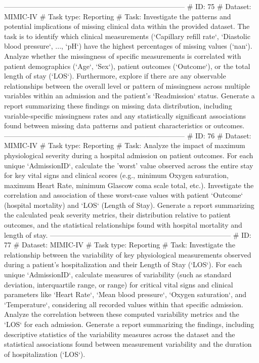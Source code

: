 \begin{tcolorbox}[colback=cadmiumgreen!5!white,colframe=forestgreen!75!white,breakable,title=\textit{Generated analytical tasks in task 4.}]
\begin{VerbatimWrap}
-----------------------------------------------------------------------------
# ID: 75  
# Dataset: MIMIC-IV 
# Task type: Reporting
# Task: Investigate the patterns and potential implications of missing clinical data within the provided dataset. The task is to identify which clinical measurements (`Capillary refill rate`, `Diastolic blood pressure`, ..., `pH`) have the highest percentages of missing values (`nan`). Analyze whether the missingness of specific measurements is correlated with patient demographics (`Age`, `Sex`), patient outcomes (`Outcome`), or the total length of stay (`LOS`). Furthermore, explore if there are any observable relationships between the overall level or pattern of missingness across multiple variables within an admission and the patient's `Readmission` status. Generate a report summarizing these findings on missing data distribution, including variable-specific missingness rates and any statistically significant associations found between missing data patterns and patient characteristics or outcomes.
-----------------------------------------------------------------------------
# ID: 76  
# Dataset: MIMIC-IV 
# Task type: Reporting
# Task: Analyze the impact of maximum physiological severity during a hospital admission on patient outcomes. For each unique `AdmissionID`, calculate the 'worst' value observed across the entire stay for key vital signs and clinical scores (e.g., minimum Oxygen saturation, maximum Heart Rate, minimum Glascow coma scale total, etc.). Investigate the correlation and association of these worst-case values with patient `Outcome` (hospital mortality) and `LOS` (Length of Stay). Generate a report summarizing the calculated peak severity metrics, their distribution relative to patient outcomes, and the statistical relationships found with hospital mortality and length of stay.
-----------------------------------------------------------------------------
# ID: 77  
# Dataset: MIMIC-IV 
# Task type: Reporting
# Task: Investigate the relationship between the variability of key physiological measurements observed during a patient's hospitalization and their Length of Stay (`LOS`). For each unique `AdmissionID`, calculate measures of variability (such as standard deviation, interquartile range, or range) for critical vital signs and clinical parameters like `Heart Rate`, `Mean blood pressure`, `Oxygen saturation`, and `Temperature`, considering all recorded values within that specific admission. Analyze the correlation between these computed variability metrics and the `LOS` for each admission. Generate a report summarizing the findings, including descriptive statistics of the variability measures across the dataset and the statistical associations found between measurement variability and the duration of hospitalization (`LOS`).

\end{VerbatimWrap}
\end{tcolorbox}

